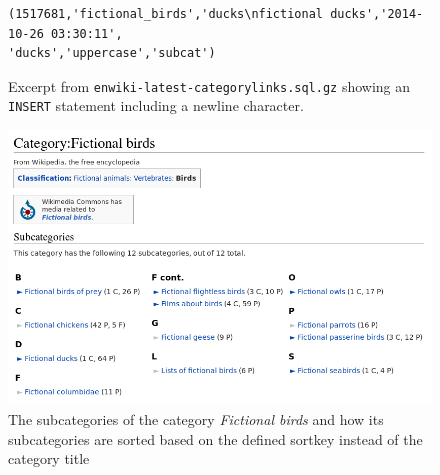 

\begin{figure}[h]
\begin{lstlisting}
(1517681,'fictional_birds','ducks\nfictional ducks','2014-10-26 03:30:11',
'ducks','uppercase','subcat')
\end{lstlisting}
\caption[\texttt{INSERT} statement with newline]{Excerpt from \texttt{enwiki-latest-categorylinks.sql.gz} showing an \texttt{INSERT} statement including a newline character. }
\label{fig:withnewline}
\end{figure}

\begin{figure}[h]
\centering
\includegraphics[width=\textwidth]{Chapters/Implementation/Fictional_birds_2}
\caption[Example of sortkey in Wikipedia]{The subcategories of the category \emph{Fictional birds} and how its subcategories are sorted based on the defined sortkey instead of the category title }
\label{fig:fictionalbirds}
\end{figure}


